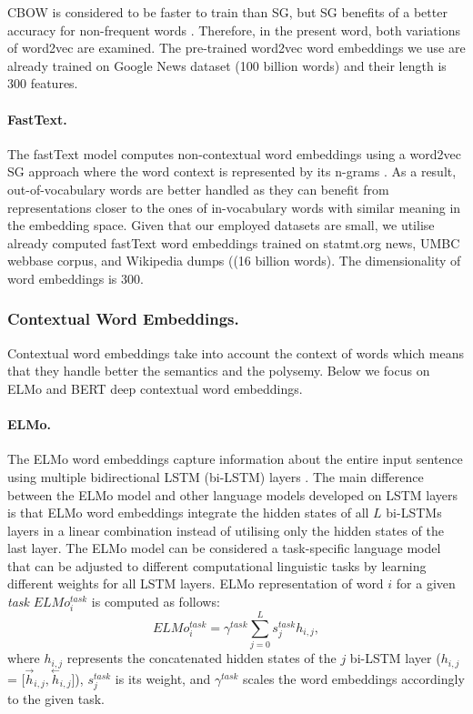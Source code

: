 \documentclass[hidelinks]{llncs}
\begin{document}
CBOW is considered to be faster to train than SG, but SG benefits of a better accuracy for non-frequent words \cite{ay2018evaluating}. Therefore, in the present word, both variations of word2vec are examined. The pre-trained word2vec word embeddings we use are already trained on Google News dataset (100 billion words) and their length is 300 features.

\paragraph{FastText. }The fastText model computes non-contextual word embeddings using a word2vec SG approach where the word context is represented by its n-grams \cite{bojanowski2017enriching}. As a result, out-of-vocabulary words are better handled as they can benefit from representations closer to the ones of in-vocabulary words with similar meaning in the embedding space. Given that our employed datasets are small, we utilise already computed fastText word embeddings trained on statmt.org news, UMBC webbase corpus, and Wikipedia dumps ((16 billion words). The dimensionality of word embeddings is 300.


\subsubsection{Contextual Word Embeddings. }Contextual word embeddings take into account the context of words which means that they handle better the semantics and the polysemy. Below we focus on ELMo and BERT deep contextual word embeddings.



\paragraph{ELMo. }The ELMo word embeddings capture information about the entire input sentence using multiple bidirectional LSTM (bi-LSTM) layers \cite{peters2018deep}. The main difference between the ELMo model and other language models developed on LSTM layers is that ELMo word embeddings integrate the hidden states of  all $L$ bi-LSTMs layers in a linear combination instead of utilising only the hidden states of the last layer. The ELMo model can be considered a task-specific language model that can be adjusted to different computational linguistic tasks by learning  different weights for all LSTM layers. ELMo representation of word $i$ for a given \textit{task} $ELMo_i^{task}$ is computed as follows:
\begin {equation}
\label{equation9}
ELMo_i^{task} = \gamma^{task}\sum_{j = 0}^Ls_j^{task}h_{i, j},
\end {equation}
where $h_{i, j}$ represents the concatenated hidden states of the $j$ bi-LSTM layer ($h_{i, j}$ = [$\overset{\rightarrow}{h}_{i, j}, \overset{\leftarrow}{h}_{i, j}$]), $s_j^{task}$ is its weight, and $\gamma^{task}$ scales the word embeddings accordingly to the given task.
\end{document}
